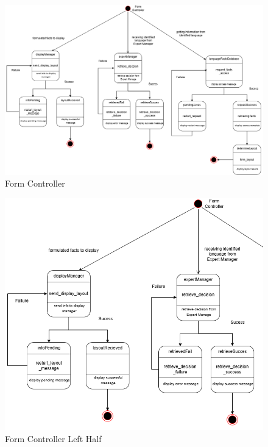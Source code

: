 \begin{figure}[H]
	\centering
	\includegraphics[width=\textwidth, height=\textheight, keepaspectratio]{Section2/images/FormController.png}
	\caption{Form Controller}
	\label{FormController}
\end{figure}

\begin{figure}[H]
	\centering
	\includegraphics[width=\textwidth, height=\textheight, keepaspectratio]{Section2/images/FormControllerLeftHalf.png}
	\caption{Form Controller Left Half}
	\label{FormController}
\end{figure}


